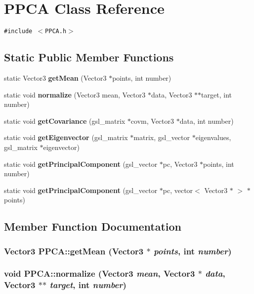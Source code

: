 \section{PPCA Class Reference}
\label{classPPCA}
{\tt \#include $<$PPCA.h$>$}

\subsection*{Static Public Member Functions}
\begin{CompactItemize}
\item 
static Vector3 {\bf get\-Mean} (Vector3 $\ast$points, int number)
\item 
static void {\bf normalize} (Vector3 mean, Vector3 $\ast$data, Vector3 $\ast$$\ast$target, int number)
\item 
static void {\bf get\-Covariance} (gsl\_\-matrix $\ast$covm, Vector3 $\ast$data, int number)
\item 
static void {\bf get\-Eigenvector} (gsl\_\-matrix $\ast$matrix, gsl\_\-vector $\ast$eigenvalues, gsl\_\-matrix $\ast$eigenvector)
\item 
static void {\bf get\-Principal\-Component} (gsl\_\-vector $\ast$pc, Vector3 $\ast$points, int number)
\item 
static void {\bf get\-Principal\-Component} (gsl\_\-vector $\ast$pc, vector$<$ Vector3 $\ast$ $>$ $\ast$points)
\end{CompactItemize}


\subsection{Member Function Documentation}
\subsubsection{\setlength{\rightskip}{0pt plus 5cm}Vector3 PPCA::get\-Mean (Vector3 $\ast$ {\em points}, int {\em number})\hspace{0.3cm}{\tt  [static]}}\label{classPPCA_35f9e81a89a4b65a6dedc193c2791321}


\subsubsection{\setlength{\rightskip}{0pt plus 5cm}void PPCA::normalize (Vector3 {\em mean}, Vector3 $\ast$ {\em data}, Vector3 $\ast$$\ast$ {\em target}, int {\em number})\hspace{0.3cm}{\tt  [static]}}\label{classPPCA_262220fe90da692398027ce112103b65}


